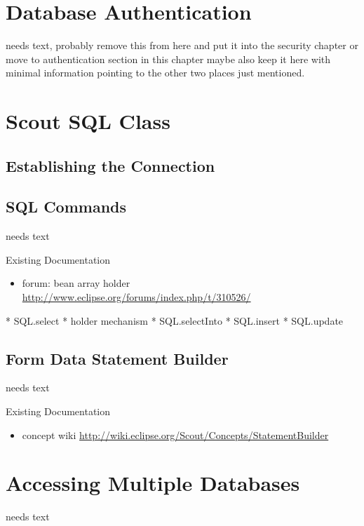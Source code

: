 \documentclass[a4paper,10pt,twoside]{book}
\begin{document}
\section{Database Authentication}
needs text, probably remove this from here and put it into the security chapter or move to authentication section in this chapter
maybe also keep it here with minimal information pointing to the other two places just mentioned.

\section{Scout SQL Class}

\subsection{Establishing the Connection}

\subsection{SQL Commands}
needs text

\noindent Existing Documentation
\begin{itemize}
  \item forum: bean array holder \url{http://www.eclipse.org/forums/index.php/t/310526/}
\end{itemize}

* SQL.select
* holder mechanism
* SQL.selectInto
* SQL.insert
* SQL.update

\subsection{Form Data Statement Builder}
needs text

\noindent Existing Documentation
\begin{itemize}
  \item concept wiki \url{http://wiki.eclipse.org/Scout/Concepts/StatementBuilder}
\end{itemize}

\section{Accessing Multiple Databases}
needs text
\end{document}
